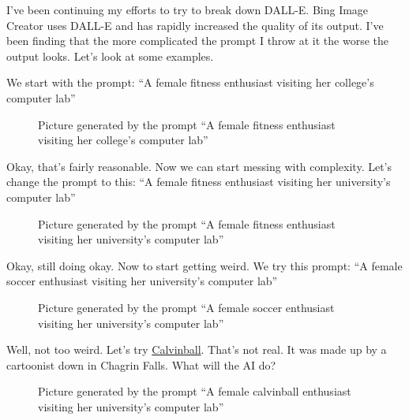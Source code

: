 I've been continuing my efforts to try to break down DALL-E. Bing Image
Creator uses DALL-E and has rapidly increased the quality of its output.
I've been finding that the more complicated the prompt I throw at it the
worse the output looks. Let's look at some examples.

We start with the prompt: ``A female fitness enthusiast visiting her
college's computer lab''

\begin{figure}
\centering
{}
\caption{Picture generated by the prompt ``A female fitness enthusiast
visiting her college's computer lab''}
\end{figure}

Okay, that's fairly reasonable. Now we can start messing with
complexity. Let's change the prompt to this: ``A female fitness
enthusiast visiting her university's computer lab''

\begin{figure}
\centering
{}
\caption{Picture generated by the prompt ``A female fitness enthusiast
visiting her university's computer lab''}
\end{figure}

Okay, still doing okay. Now to start getting weird. We try this prompt:
``A female soccer enthusiast visiting her university's computer lab''

\begin{figure}
\centering
{}
\caption{Picture generated by the prompt ``A female soccer enthusiast
visiting her university's computer lab''}
\end{figure}

Well, not too weird. Let's try
\href{https://en.wikipedia.org/w/index.php?title=Calvin_and_Hobbes&oldid=1179496024\#Calvinball}{Calvinball}.
That's not real. It was made up by a cartoonist down in Chagrin Falls.
What will the AI do?

\begin{figure}
\centering
{}
\caption{Picture generated by the prompt ``A female calvinball
enthusiast visiting her university's computer lab''}
\end{figure}

